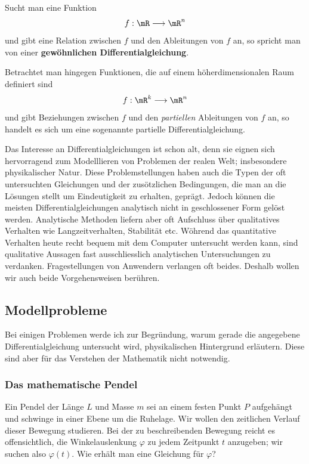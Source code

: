 \documentclass[%
draft,
11pt,%
twoside,%
titlepage,%
german,%
headsepline%
]{scrartcl}
\begin{document}
\begin{defn}
Sucht man eine Funktion
$$f:\mR\longrightarrow\mR^n$$
und gibt eine Relation zwischen $f$ und den Ableitungen von $f$ an, so spricht man von einer \textbf{gew\"ohnlichen Differentialgleichung}.
\end{defn}


\begin{bem}
Betrachtet man hingegen Funktionen, die auf einem h\"oherdimensionalen Raum definiert sind
$$f:\mR^k\longrightarrow\mR^n$$
und gibt Beziehungen zwischen $f$ und den \emph{partiellen} Ableitungen von $f$ an, so handelt es sich um eine sogenannte partielle Differentialgleichung.
\end{bem}

Das Interesse an Differentialgleichungen ist schon alt, denn sie eignen sich hervorragend zum Modelllieren von Problemen der realen Welt; insbesondere physikalischer Natur. Diese Problemstellungen haben auch die Typen der oft untersuchten Gleichungen und der zus\"otzlichen Bedingungen, die man an die L\"osungen stellt um Eindeutigkeit zu erhalten, gepr\"agt. Jedoch k\"onnen die meisten Differentialgleichungen analytisch nicht in geschlossener Form gel\"ost werden. Analytische Methoden liefern aber oft Aufschluss \"uber qualitatives Verhalten wie Langzeitverhalten, Stabilit\"at etc. W\"ohrend das quantitative Verhalten heute recht bequem mit dem Computer untersucht werden kann, sind qualitative Aussagen fast ausschliesslich analytischen Untersuchungen zu verdanken. Fragestellungen von Anwendern verlangen oft beides. Deshalb wollen wir auch beide Vorgehensweisen ber\"uhren.

\subsection{Modellprobleme}

Bei einigen Problemen werde ich zur Begr\"undung, warum gerade die angegebene Differentialgleichung untersucht wird, physikalischen Hintergrund erl\"autern. Diese sind aber f\"ur das Verstehen der Mathematik nicht notwendig.

\subsubsection{Das mathematische Pendel}

Ein
Pendel der L\"ange $L$ und Masse $m$ sei an einem festen Punkt $P$ aufgeh\"angt und schwinge in einer Ebene um die Ruhelage. Wir wollen den zeitlichen Verlauf dieser Bewegung studieren. Bei der zu beschreibenden Bewegung reicht es offensichtlich, die Winkelauslenkung $\varphi$ zu jedem Zeitpunkt $t$ anzugeben; wir suchen also $\varphi(t)$. Wie erh\"alt man eine Gleichung f\"ur $\varphi$?
\end{document}
